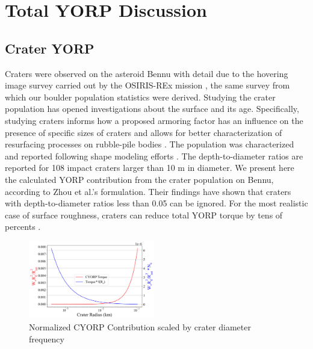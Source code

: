 \section{Total YORP Discussion}\label{discussion}
\subsection{Crater YORP}
Craters were observed on the asteroid Bennu with detail due to the hovering image survey carried out by the OSIRIS-REx mission \citep{Walsh2019}, the same survey from which our boulder population statistics were derived. Studying the crater population has opened investigations about the surface and its age. Specifically, studying craters informs how a proposed armoring factor has an influence on the presence of specific sizes of craters and allows for better characterization of resurfacing processes on rubble-pile bodies \citep{Bierhaus2022}.  The population was characterized and reported following shape modeling efforts \citep{Daly2020a}. The depth-to-diameter ratios are reported for 108 impact craters larger than 10 m in diameter.  We present here the calculated YORP contribution from the crater population on Bennu, according to Zhou et al.'s formulation. Their findings have shown that craters with depth-to-diameter ratios less than 0.05 can be ignored. For the most realistic case of surface roughness, craters can reduce total YORP torque by tens of percents \citep{Zhou2023}. 

\begin{figure}[H]
    \centering
    \includegraphics[width = 0.49\textwidth]{fig/cyorp.png}
    \caption{Normalized CYORP Contribution scaled by crater diameter frequency}
    \label{fig:three graphs}
\end{figure}

